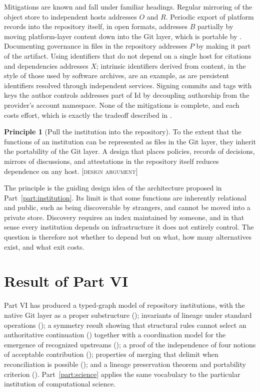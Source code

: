 \documentclass[11pt,twoside,openright]{book}
\theoremstyle{plain}
\theoremstyle{definition}
\newtheorem{principle}[theorem]{Principle}
\theoremstyle{remark}
\newcommand{\Design}{\textup{\textsc{[design argument]}}}
\begin{document}
Mitigations are known and fall under familiar headings. Regular mirroring of the object store to independent hosts addresses $O$ and $R$. Periodic export of platform records into the repository itself, in open formats, addresses $B$ partially by moving platform-layer content down into the Git layer, which is portable by . Documenting governance in files in the repository addresses $P$ by making it part of the artifact. Using identifiers that do not depend on a single host for citations and dependencies addresses $X$; intrinsic identifiers derived from content, in the style of those used by software archives, are an example, as are persistent identifiers resolved through independent services. Signing commits and tags with keys the author controls addresses part of $\mathrm{Id}$ by decoupling authorship from the provider's account namespace. None of the mitigations is complete, and each costs effort, which is exactly the tradeoff described in .

\begin{principle}[Pull the institution into the repository]\label{pr:pull}
To the extent that the functions of an institution can be represented as files in the Git layer, they inherit the portability of the Git layer. A design that places policies, records of decisions, mirrors of discussions, and attestations in the repository itself reduces dependence on any host.
\Design{}
\end{principle}

The principle is the guiding design idea of the architecture proposed in Part~\ref{part:institution}. Its limit is that some functions are inherently relational and public, such as being discoverable by strangers, and cannot be moved into a private store. Discovery requires an index maintained by someone, and in that sense every institution depends on infrastructure it does not entirely control. The question is therefore not whether to depend but on what, how many alternatives exist, and what exit costs.

\section{Result of Part VI}

Part VI has produced a typed-graph model of repository institutions, with the native Git layer as a proper substructure (); invariants of lineage under standard operations (); a symmetry result showing that structural rules cannot select an authoritative continuation () together with a coordination model for the emergence of recognized upstreams (); a proof of the independence of four notions of acceptable contribution (); properties of merging that delimit when reconciliation is possible (); and a lineage preservation theorem and portability criterion (). Part~\ref{part:science} applies the same vocabulary to the particular institution of computational science.
\end{document}
